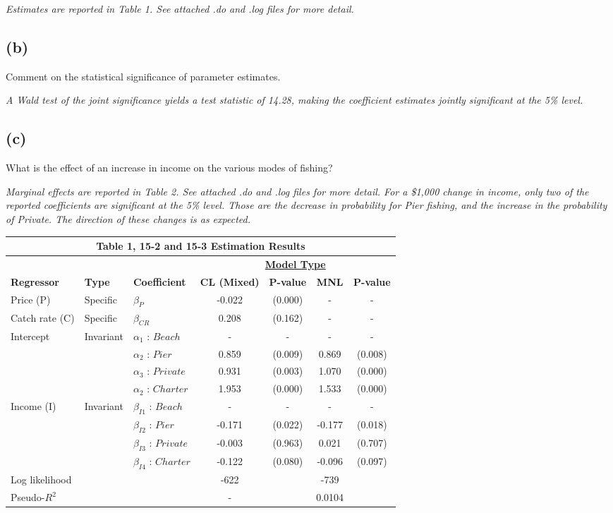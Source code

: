 \documentclass[11pt]{article}
\theoremstyle{definition}
\begin{document}
\textit{Estimates are reported in Table 1. See attached .do and .log files for more detail.}

\subsection*{(b)}
Comment on the statistical significance of parameter estimates.

\textit{A Wald test of the joint significance yields a test statistic of 14.28, making the coefficient estimates jointly significant at the 5\% level.}

\subsection*{(c)}
What is the effect of an increase in income on the various modes of fishing?

\textit{Marginal effects are reported in Table 2. See attached .do and .log files for more detail. For a \$1,000 change in income, only two of the reported coefficients are significant at the 5\% level.  Those are the decrease in probability for Pier fishing, and the increase in the probability of Private.  The direction of these changes is as expected.}

\vspace{2.5mm}
\noindent
\begin{center}
\begin{tabular}{l l l c c c c}
\hline\hline
\multicolumn{7}{c}{\textbf{Table 1, 15-2 and 15-3 Estimation Results}} \\
\hline\hline 
& & & \multicolumn{4}{c}{\underline{\textbf{Model Type}}} \\
\textbf{Regressor} & \textbf{Type} & \textbf{Coefficient} & \textbf{CL (Mixed)} &\textbf{P-value} & \textbf{MNL} & \textbf{P-value} \\
\hline
Price (P) & Specific & $\beta_{P}$ & -0.022 & (0.000) & - & - \\ 
Catch rate (C) & Specific & $\beta_{CR}$ & 0.208 & (0.162) & - & - \\
Intercept & Invariant & $\alpha_1$ : $Beach$ & - & - & - & - \\ 
& & $\alpha_2$ : $Pier$ & 0.859 & (0.009) & 0.869 & (0.008)\\
& & $\alpha_3$ : $Private$ & 0.931 & (0.003) & 1.070 & (0.000) \\
& & $\alpha_2$ : $Charter$ & 1.953 & (0.000) & 1.533 & (0.000)\\
Income (I) & Invariant & $\beta_{I1}$ : $Beach$ & - & - & - & - \\
 &  & $\beta_{I2}$ : $Pier$ & -0.171 & (0.022) & -0.177 & (0.018) \\
 &  & $\beta_{I3}$ : $Private$ & -0.003 & (0.963) & 0.021 & (0.707) \\
 &  & $\beta_{I4}$ : $Charter$ & -0.122 & (0.080) & -0.096 & (0.097) \\
Log likelihood & & & -622 & & -739 & \\
Pseudo-$R^2$ & & & - & & 0.0104 & \\
\hline\hline
\end{tabular} 
\end{center} 
\end{document}
